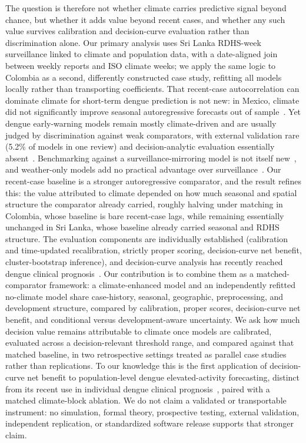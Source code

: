 \documentclass[11pt,a4paper]{article}
\begin{document}
The question is therefore not whether climate carries predictive signal beyond chance, but whether it adds value beyond recent cases, and whether any such value survives calibration and decision-curve evaluation rather than discrimination alone. Our primary analysis uses Sri Lanka RDHS-week surveillance linked to climate and population data, with a date-aligned join between weekly reports and ISO climate weeks; we apply the same logic to Colombia as a second, differently constructed case study, refitting all models locally rather than transporting coefficients. That recent-case autocorrelation can dominate climate for short-term dengue prediction is not new: in Mexico, climate did not significantly improve seasonal autoregressive forecasts out of sample~\cite{Johansson2016}. Yet dengue early-warning models remain mostly climate-driven and are usually judged by discrimination against weak comparators, with external validation rare (5.2\% of models in one review) and decision-analytic evaluation essentially absent~\cite{Leung2022,HussainAlkhateeb2021}. Benchmarking against a surveillance-mirroring model is not itself new~\cite{Lowe2013}, and weather-only models add no practical advantage over surveillance~\cite{Benedum2020}. Our recent-case baseline is a stronger autoregressive comparator, and the result refines this: the value attributed to climate depended on how much seasonal and spatial structure the comparator already carried, roughly halving under matching in Colombia, whose baseline is bare recent-case lags, while remaining essentially unchanged in Sri Lanka, whose baseline already carried seasonal and RDHS structure. The evaluation components are individually established (calibration and time-updated recalibration, strictly proper scoring, decision-curve net benefit, cluster-bootstrap inference), and decision-curve analysis has recently reached dengue clinical prognosis~\cite{Sangkaew2026,Vickers2006,Binuya2022}. Our contribution is to combine them as a matched-comparator framework: a climate-enhanced model and an independently refitted no-climate model share case-history, seasonal, geographic, preprocessing, and development structure, compared by calibration, proper scores, decision-curve net benefit, and conditional versus development-aware uncertainty. We ask how much decision value remains attributable to climate once models are calibrated, evaluated across a decision-relevant threshold range, and compared against that matched baseline, in two retrospective settings treated as parallel case studies rather than replications. To our knowledge this is the first application of decision-curve net benefit to population-level dengue elevated-activity forecasting, distinct from its recent use in individual dengue clinical prognosis~\cite{Sangkaew2026}, paired with a matched climate-block ablation. We do not claim a validated or transportable instrument: no simulation, formal theory, prospective testing, external validation, independent replication, or standardized software release supports that stronger claim.
\end{document}
